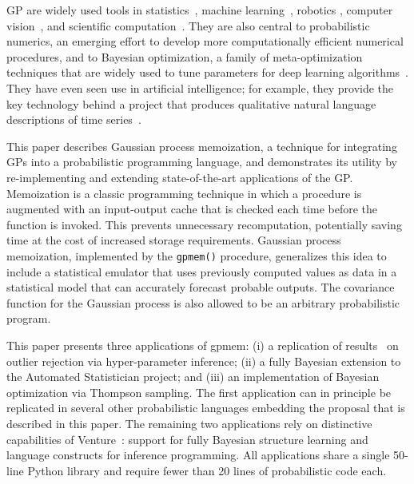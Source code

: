 \ac{GP} are widely used tools in statistics~\citep{barry1986nonparametric}, machine learning~\citep{neal1995bayesian,williams1998bayesian,kuss2005assessing,rasmussen2006gaussian,damianou2013deep}, robotics \citep{ferris2006gaussian}, computer vision~\citep{kemmler2013one}, and scientific computation~\citep{kennedy2001bayesian,schneider2008simulations,kwan2013cosmic}.
They are also central to probabilistic numerics, an emerging effort to develop more computationally efficient numerical procedures, and to Bayesian optimization, a family of meta-optimization techniques that are widely used to tune parameters for deep learning algorithms~\citep{snoek2012practical,gelbart2014bayesian}. They have even seen use in artificial intelligence; for example, they provide the key technology behind a project that produces qualitative natural language descriptions of time series~\citep{duvenaud2013structure,lloyd2014automatic}.

This paper describes Gaussian process memoization, a technique for integrating \ac{GP}s into a probabilistic programming language, and demonstrates its utility by re-implementing and extending state-of-the-art applications of the GP. Memoization is a classic programming technique in which a procedure is augmented with an input-output cache that is checked each time before the function is invoked. This prevents unnecessary recomputation, potentially saving time at the cost of increased storage requirements. Gaussian process memoization, implemented by the {\tt gpmem()} procedure, generalizes this idea to include a statistical emulator that uses previously computed values as data in a statistical model that can accurately forecast probable outputs. The covariance function for the Gaussian process is also allowed to be an arbitrary probabilistic program.

This paper presents three applications of gpmem: (i) a replication of results~\citet{neal1997monte} on outlier rejection via hyper-parameter inference; (ii) a fully Bayesian extension to the Automated Statistician project; and (iii) an implementation of Bayesian optimization via Thompson sampling. The first application can in principle be replicated in several other probabilistic languages embedding the proposal that is described in this paper. The remaining two applications rely on distinctive capabilities of Venture~\citep{mansinghka2014venture}: support for fully Bayesian structure learning and language constructs for inference programming. All applications share a single 50-line Python library and require fewer than 20 lines of probabilistic code each.


